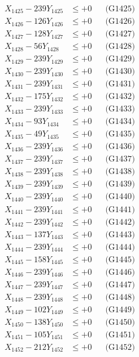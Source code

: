 \documentclass[a4paper,10pt]{article}
\begin{document}
{\begin{align}
X_{1425} - 239Y_{1425} &\leq +0 && \text{(G1425)} \\
X_{1426} - 126Y_{1426} &\leq +0 && \text{(G1426)} \\
X_{1427} - 128Y_{1427} &\leq +0 && \text{(G1427)} \\
X_{1428} - 56Y_{1428} &\leq +0 && \text{(G1428)} \\
X_{1429} - 239Y_{1429} &\leq +0 && \text{(G1429)} \\
X_{1430} - 239Y_{1430} &\leq +0 && \text{(G1430)} \\
\allowbreak
X_{1431} - 239Y_{1431} &\leq +0 && \text{(G1431)} \\
X_{1432} - 175Y_{1432} &\leq +0 && \text{(G1432)} \\
X_{1433} - 239Y_{1433} &\leq +0 && \text{(G1433)} \\
X_{1434} - 93Y_{1434} &\leq +0 && \text{(G1434)} \\
X_{1435} - 49Y_{1435} &\leq +0 && \text{(G1435)} \\
X_{1436} - 239Y_{1436} &\leq +0 && \text{(G1436)} \\
X_{1437} - 239Y_{1437} &\leq +0 && \text{(G1437)} \\
X_{1438} - 239Y_{1438} &\leq +0 && \text{(G1438)} \\
X_{1439} - 239Y_{1439} &\leq +0 && \text{(G1439)} \\
X_{1440} - 239Y_{1440} &\leq +0 && \text{(G1440)} \\
\allowbreak
X_{1441} - 239Y_{1441} &\leq +0 && \text{(G1441)} \\
X_{1442} - 239Y_{1442} &\leq +0 && \text{(G1442)} \\
X_{1443} - 137Y_{1443} &\leq +0 && \text{(G1443)} \\
X_{1444} - 239Y_{1444} &\leq +0 && \text{(G1444)} \\
X_{1445} - 158Y_{1445} &\leq +0 && \text{(G1445)} \\
X_{1446} - 239Y_{1446} &\leq +0 && \text{(G1446)} \\
X_{1447} - 239Y_{1447} &\leq +0 && \text{(G1447)} \\
X_{1448} - 239Y_{1448} &\leq +0 && \text{(G1448)} \\
X_{1449} - 102Y_{1449} &\leq +0 && \text{(G1449)} \\
X_{1450} - 138Y_{1450} &\leq +0 && \text{(G1450)} \\
\allowbreak
X_{1451} - 105Y_{1451} &\leq +0 && \text{(G1451)} \\
X_{1452} - 212Y_{1452} &\leq +0 && \text{(G1452)} \\

\end{align}}
\end{document}
